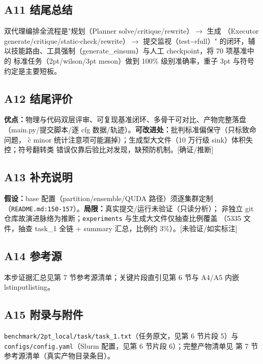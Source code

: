 \documentclass[UTF8]{ctexart}
\begin{document}
\subsection{A11 结尾总结}

\begin{conclbox}
双代理编排全流程是"规划（Planner solve/critique/rewrite）$\rightarrow$ 生成
（Executor generate/critique/static-check/rewrite）$\rightarrow$ 提交监视（test→full）"
的闭环，辅以技能路由、工具强制（generate\_einsum）与人工 checkpoint，将 70 项基准中的
标准任务（2pt/wilson/3pt meson）做到 100\% 级别准确率，重子 3pt 与符号约定是主要短板。
\end{conclbox}

\subsection{A12 结尾评价}

\textbf{优点：}物理与代码双层评审、可复现基准闭环、多骨干可对比、产物完整落盘
（main.py/提交脚本/逐 cfg 数据/轨迹）。\textbf{可改进处：}批判标准偏保守（只标致命问题，
\`{c} minor 统计注意项可能漏掉）；生成型大文件（10 万行级 sink）体积失控；符号翻转类
错误仅靠后验比对发现，缺预防机制。[确证/推断]

\subsection{A13 补充说明}

\textbf{假设：}base 配置（partition/ensemble/QUDA 路径）须逐集群定制
（\texttt{\nolinkurl{README.md:150-157}}）。\textbf{局限：}真实提交/运行未验证（只读分析）；
非独立 git 仓库故演进脉络为推断；\texttt{experiments} 与生成大文件仅抽查比例覆盖
（5335 文件，抽查 task\_1 全链 + summary 汇总，比例约 3\%）。[未验证/如实标注]

\subsection{A14 参考源}

本步证据汇总见第 7 节参考源清单；关键片段直引见第 6 节与 A4/A5 内嵌 lstinputlisting。

\subsection{A15 附录与附件}

\texttt{benchmark/2pt\_local/task/task\_1.txt}（任务原文，见第 6 节片段 5）与
\texttt{configs/config.yaml}（Slurm 配置，见第 6 节片段 6）；完整产物清单见
第 7 节参考源清单（真实产物目录条目）。
\end{document}
